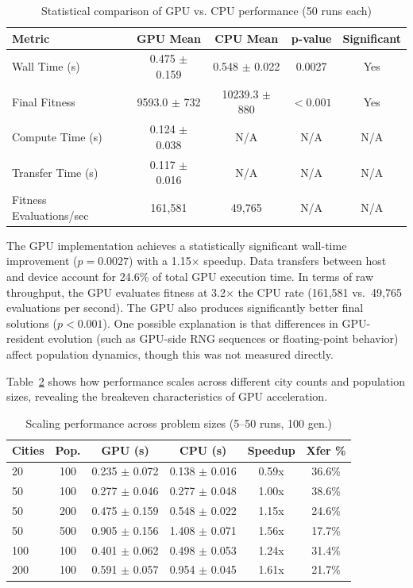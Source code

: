\documentclass[a4paper,14pt]{extarticle}
\begin{document}
\begin{table}[H]
\centering
\caption{Statistical comparison of GPU vs. CPU performance (50 runs each)}
\label{tab:primary_tsp_results}
\begin{tabular}{@{}lcccc@{}}
\toprule
\textbf{Metric} & \textbf{GPU Mean} & \textbf{CPU Mean} & \textbf{p-value} & \textbf{Significant} \\
\midrule
Wall Time (s) & 0.475 $\pm$ 0.159 & 0.548 $\pm$ 0.022 & 0.0027 & Yes \\
Final Fitness & 9593.0 $\pm$ 732 & 10239.3 $\pm$ 880 & $< 0.001$ & Yes \\
Compute Time (s) & 0.124 $\pm$ 0.038 & N/A & N/A & N/A \\
Transfer Time (s) & 0.117 $\pm$ 0.016 & N/A & N/A & N/A \\
Fitness Evaluations/sec & 161,581 & 49,765 & N/A & N/A \\
\bottomrule
\end{tabular}
\end{table}

The GPU implementation achieves a statistically significant wall-time improvement ($p = 0.0027$) with a 1.15$\times$ speedup. Data transfers between host and device account for 24.6\% of total GPU execution time. In terms of raw throughput, the GPU evaluates fitness at 3.2$\times$ the CPU rate (161,581 vs.\ 49,765 evaluations per second). The GPU also produces significantly better final solutions ($p < 0.001$). One possible explanation is that differences in GPU-resident evolution (such as GPU-side RNG sequences or floating-point behavior) affect population dynamics, though this was not measured directly.


Table~\ref{tab:tsp_scaling_results} shows how performance scales across different city counts and population sizes, revealing the breakeven characteristics of GPU acceleration.

\begin{table}[H]
\centering
\caption{Scaling performance across problem sizes (5--50 runs, 100 gen.)}
\label{tab:tsp_scaling_results}
\small
\begin{tabular}{@{}lccccc@{}}
\toprule
\textbf{Cities} & \textbf{Pop.} & \textbf{GPU (s)} & \textbf{CPU (s)} & \textbf{Speedup} & \textbf{Xfer \%} \\
\midrule
20 & 100 & 0.235 $\pm$ 0.072 & 0.138 $\pm$ 0.016 & 0.59x & 36.6\% \\
50 & 100 & 0.277 $\pm$ 0.046 & 0.277 $\pm$ 0.048 & 1.00x & 38.6\% \\
50 & 200 & 0.475 $\pm$ 0.159 & 0.548 $\pm$ 0.022 & 1.15x & 24.6\% \\
50 & 500 & 0.905 $\pm$ 0.156 & 1.408 $\pm$ 0.071 & 1.56x & 17.7\% \\
100 & 100 & 0.401 $\pm$ 0.062 & 0.498 $\pm$ 0.053 & 1.24x & 31.4\% \\
200 & 100 & 0.591 $\pm$ 0.057 & 0.954 $\pm$ 0.045 & 1.61x & 21.7\% \\
\bottomrule
\end{tabular}
\end{table}
\end{document}
